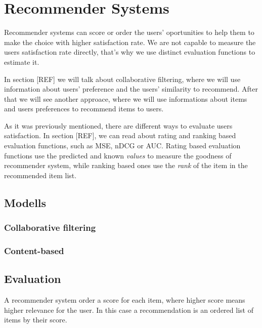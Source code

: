 \chapter{Recommender Systems}
Recommender systems can score or order the users' oportunities to help them to
make the choice with higher satisfaction rate. We are not capable to measure
the users satisfaction rate directly, that's why we use distinct evaluation 
functions to estimate it.

In section [REF] we will talk about collaborative filtering, where we will use
information about users' preference and the users' similarity to recommend.
 After that we will see another approace, where we will use informations about 
items and users preferences to recommend items to users.

As it was previously mentioned, there are different ways to evaluate users 
satisfaction. In section [REF], we can read about rating and ranking based
 evaluation functions, such as MSE, nDCG or AUC. Rating based evaluation 
functions use the predicted and known \emph{values} to measure the goodness of
 recommender system, while ranking based ones use the \emph{rank} of the item in
 the recommended item list.



\section{Modells}
\subsection{Collaborative filtering}
\subsection{Content-based}

\section{Evaluation}

A recommender system order a score for each item, where higher score means 
higher relevance for the user. In this case a recommendation is an ordered list 
of items by their score. 


